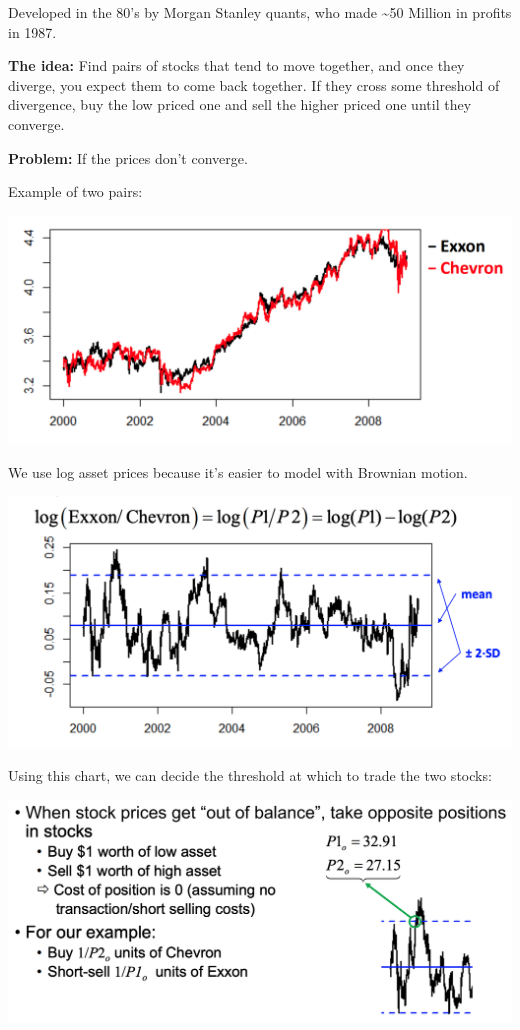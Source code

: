 \documentclass[
  oneside]{book}
\begin{document}
Developed in the 80's by Morgan Stanley quants, who made \textasciitilde50 Million in profits in 1987.

\textbf{The idea:} Find pairs of stocks that tend to move together, and once they diverge, you expect them to come back together. If they cross some threshold of divergence, buy the low priced one and sell the higher priced one until they converge.

\textbf{Problem:} If the prices don't converge.

Example of two pairs:

\includegraphics{Notes/Obsidian-Attachments/9-Statistical-Arbitrage.png}

We use log asset prices because it's easier to model with Brownian motion.

\includegraphics{Notes/Obsidian-Attachments/9-Statistical-Arbitrage-1.png}

Using this chart, we can decide the threshold at which to trade the two stocks:

\includegraphics{Notes/Obsidian-Attachments/9-Statistical-Arbitrage-2.png}
\end{document}
